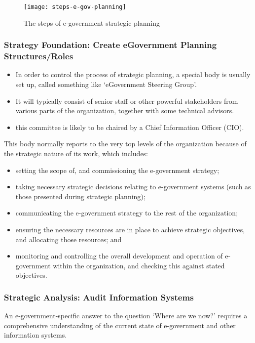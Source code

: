\begin{figure}[hpt]
	\centering
	\texttt{[image: steps-e-gov-planning]}
	\caption{The steps of e-government strategic planning}
	\label{fig:steps-e-gov-planning}
\end{figure}

\subsubsection{Strategy Foundation: Create eGovernment Planning Structures/Roles}
\begin{itemize}
	\item In order to control the process of strategic planning, a special body is usually set up,	called something like `eGovernment Steering Group’. 
	\item It will typically consist of senior staff or other powerful stakeholders
	from various parts of the organization, together with some technical advisors.
	\item this committee is likely to be chaired by a Chief Information Officer
	(CIO).
\end{itemize}

This body normally reports to the very
top levels of the organization because of the
strategic nature of its work, which includes:

\begin{itemize}
	\item setting the scope of, and commissioning the e-government strategy; 
	\item taking necessary strategic decisions relating to e-government systems (such as those presented during strategic	planning); 
	\item communicating the e-government strategy to the rest of the organization; \item ensuring the necessary resources are in place to achieve strategic objectives, and allocating those resources; and 
	\item monitoring and controlling the overall development and operation of
	e-government within the organization, and
	checking this against stated objectives.
\end{itemize}

\subsubsection{Strategic Analysis: Audit Information Systems}
An e-government-specific answer to the
question ‘Where are we now?’ requires a
comprehensive understanding of the current
state of e-government and other information
systems.

